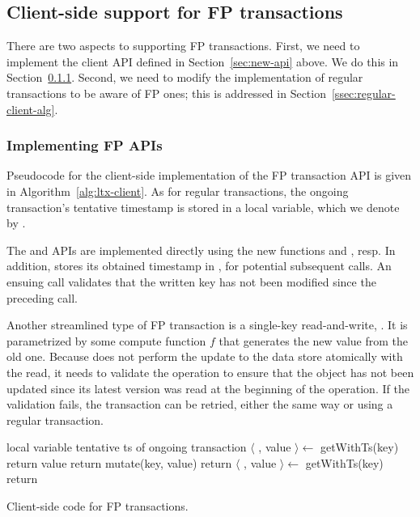 \subsection{Client-side support for FP transactions} \label{ssec:lc-client}

There are two aspects to supporting FP transactions. First, we need to implement the client API defined in Section~\ref{sec:new-api} above.
We do this in Section~\ref{ssec:local-client-alg}. Second, we need to modify the implementation of regular transactions to be aware of 
FP ones; this is addressed in Section~\ref{ssec:regular-client-alg}.

\subsubsection{Implementing FP APIs} \label{ssec:local-client-alg}

Pseudocode for the client-side implementation of the FP transaction API is given in  Algorithm~\ref{alg:ltx-client}. 
As for regular transactions, the ongoing transaction's tentative timestamp is stored in a local variable,
which we denote by . 

The 
 and  APIs are implemented directly using the new functions  and , resp.
In addition,  stores its obtained timestamp in  ,  for potential subsequent  calls.
An ensuing  call validates that the written key has not been modified since the preceding  call.


 Another streamlined type of FP transaction is a single-key read-and-write,  . It is
parametrized by some compute function $f$ that generates the new value from the old one.
Because  does not perform the update to the data store atomically
with the read, it needs to validate the  operation to ensure that the object
has not been updated since its latest version was read at the beginning of the
operation. If the validation fails, the transaction can be retried, either the
same way or using a regular transaction.


\begin{algorithm}[htb]
\begin{algorithmic}
\State local variable  \Comment tentative ts of ongoing transaction
\Statex
{} 
\State $\langle$ , value  $\rangle \leftarrow$ getWithTs(key)
\State  return value
\EndProcedure
%
\Statex
{} 
\State  return mutate(key, value)
\EndProcedure
%
 \Statex
{} 
\State return 
\EndProcedure
%
 \Statex
{} 
\State $\langle$ , value $\rangle \leftarrow$ getWithTs(key)
\State  return 
\EndProcedure

\end{algorithmic}
\caption{Client-side code for FP transactions.}
\label{alg:ltx-client}
\end{algorithm}

